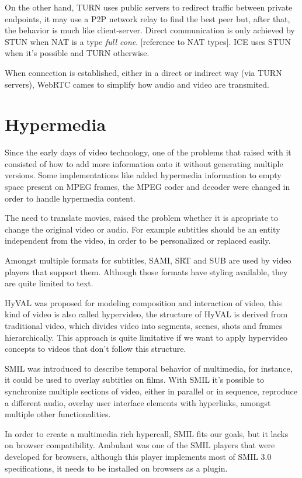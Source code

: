 \documentclass[11pt,twocolumn]{article}
\begin{document}
On the other hand, TURN uses public servers to redirect traffic between private endpoints, it may use a P2P network relay to find the best peer but, after that, the behavior is much like client-server. Direct communication is only achieved by STUN when NAT is a type \textit{full cone}. {\color{red} [reference to NAT types]}. ICE uses STUN when it's possible and TURN otherwise.

When connection is established, either in a direct or indirect way (via TURN servers), WebRTC cames to simplify how audio and video are transmited. 

\section{Hypermedia}

  Since the early days of video technology, one of the problems that raised with it consisted of how to add more information onto it without generating multiple versions. Some implementations like \cite{embedded} added hypermedia information to empty space present on MPEG frames, the MPEG coder and decoder were changed in order to handle hypermedia content.

  The need to translate movies, raised the problem whether it is apropriate to change the original video or audio. For example subtitles should be an entity independent from the video, in order to be personalized or replaced easily.
 
  Amongst multiple formats for subtitles, SAMI, SRT and SUB are used by video players that support them. Although those formats have styling available, they are quite limited to text. 

  HyVAL\cite{hyval} was proposed for modeling composition and interaction of video, this kind of video is also called hypervideo, the structure of HyVAL is derived from traditional video, which divides video into segments, scenes, shots and frames hierarchically. This approach is quite limitative if we want to apply hypervideo concepts to videos that don't follow this structure.

  SMIL was introduced to describe temporal behavior of multimedia, for instance, it could be used to overlay subtitles on films. With SMIL it's possible to synchronize multiple sections of video, either in parallel or in sequence, reproduce a different audio, overlay user interface elements with hyperlinks, amongst multiple other functionalities.

  In order to create a multimedia rich hypercall, SMIL fits our goals, but it lacks on browser compatibility. Ambulant \cite{ambulant} was one of the SMIL players that were developed for browsers, although this player implements most of SMIL 3.0 specifications, it needs to be installed on browsers as a plugin.
\end{document}
